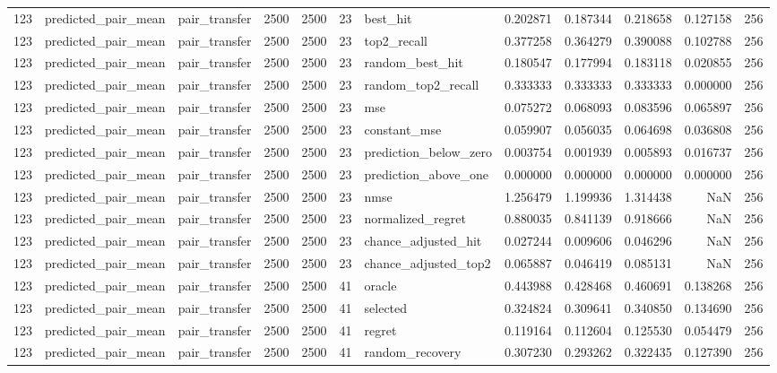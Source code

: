 \begin{tabular}{rllrrrlrrrrr}
123 & predicted_pair_mean & pair_transfer & 2500 & 2500 & 23 & best_hit & 0.202871 & 0.187344 & 0.218658 & 0.127158 & 256 \\
123 & predicted_pair_mean & pair_transfer & 2500 & 2500 & 23 & top2_recall & 0.377258 & 0.364279 & 0.390088 & 0.102788 & 256 \\
123 & predicted_pair_mean & pair_transfer & 2500 & 2500 & 23 & random_best_hit & 0.180547 & 0.177994 & 0.183118 & 0.020855 & 256 \\
123 & predicted_pair_mean & pair_transfer & 2500 & 2500 & 23 & random_top2_recall & 0.333333 & 0.333333 & 0.333333 & 0.000000 & 256 \\
123 & predicted_pair_mean & pair_transfer & 2500 & 2500 & 23 & mse & 0.075272 & 0.068093 & 0.083596 & 0.065897 & 256 \\
123 & predicted_pair_mean & pair_transfer & 2500 & 2500 & 23 & constant_mse & 0.059907 & 0.056035 & 0.064698 & 0.036808 & 256 \\
123 & predicted_pair_mean & pair_transfer & 2500 & 2500 & 23 & prediction_below_zero & 0.003754 & 0.001939 & 0.005893 & 0.016737 & 256 \\
123 & predicted_pair_mean & pair_transfer & 2500 & 2500 & 23 & prediction_above_one & 0.000000 & 0.000000 & 0.000000 & 0.000000 & 256 \\
123 & predicted_pair_mean & pair_transfer & 2500 & 2500 & 23 & nmse & 1.256479 & 1.199936 & 1.314438 & NaN & 256 \\
123 & predicted_pair_mean & pair_transfer & 2500 & 2500 & 23 & normalized_regret & 0.880035 & 0.841139 & 0.918666 & NaN & 256 \\
123 & predicted_pair_mean & pair_transfer & 2500 & 2500 & 23 & chance_adjusted_hit & 0.027244 & 0.009606 & 0.046296 & NaN & 256 \\
123 & predicted_pair_mean & pair_transfer & 2500 & 2500 & 23 & chance_adjusted_top2 & 0.065887 & 0.046419 & 0.085131 & NaN & 256 \\
123 & predicted_pair_mean & pair_transfer & 2500 & 2500 & 41 & oracle & 0.443988 & 0.428468 & 0.460691 & 0.138268 & 256 \\
123 & predicted_pair_mean & pair_transfer & 2500 & 2500 & 41 & selected & 0.324824 & 0.309641 & 0.340850 & 0.134690 & 256 \\
123 & predicted_pair_mean & pair_transfer & 2500 & 2500 & 41 & regret & 0.119164 & 0.112604 & 0.125530 & 0.054479 & 256 \\
123 & predicted_pair_mean & pair_transfer & 2500 & 2500 & 41 & random_recovery & 0.307230 & 0.293262 & 0.322435 & 0.127390 & 256 \\

\end{tabular}

